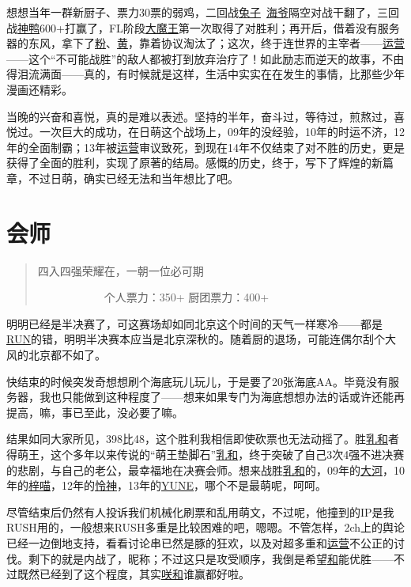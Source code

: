 想想当年一群新厨子、票力30票的弱鸡，二回战\uline{兔子}~\uline{海爷}隔空对战干翻了，三回战\uline{神鸭}600+打赢了，FL阶段\uline{大魔王}第一次取得了对胜利；再开后，借着没有服务器的东风，拿下了\uline{粉}、\uline{黄}，靠着协议淘汰了；这次，终于连世界的主宰者——\uline{运营}——这个“不可能战胜”的敌人都被打到放弃治疗了！如此励志而逆天的故事，不由得泪流满面——真的，有时候就是这样，生活中实实在在发生的事情，比那些少年漫画还精彩。

当晚的兴奋和喜悦，真的是难以表述。坚持的半年，奋斗过，等待过，煎熬过，喜悦过。一次巨大的成功，在日萌这个战场上，09年的没经验，10年的时运不济，12年的全面制霸；13年被\uline{运营}审议致死，到现在14年不仅结束了对不胜的历史，更是获得了全面的胜利，实现了原著的结局。感慨的历史，终于，写下了辉煌的新篇章，不过日萌，确实已经无法和当年想比了吧。

\chapter{会师}
\begin{quote}
四入四强荣耀在，一朝一位必可期

　　　　　　个人票力：350+ 厨团票力：400+
\end{quote}

明明已经是半决赛了，可这赛场却如同北京这个时间的天气一样寒冷——都是\uline{RUN}的错，明明半决赛本应当是北京深秋的。随着厨的退场，可能连偶尔刮个大风的北京都不如了。

快结束的时候突发奇想想刷个海底玩儿玩儿，于是要了20张海底AA。毕竟没有服务器，我也只能做到这种程度了——想来如果专门为海底想想办法的话或许还能再提高，嘛，事已至此，没必要了嘛。

结果如同大家所见，398比48，这个胜利我相信即使砍票也无法动摇了。胜\uline{乳和}者得萌王，这个多年以来传说的“萌王垫脚石”\uline{乳和}，终于突破了自己3次4强不进决赛的悲剧，与自己的老公，最幸福地在决赛会师。想来战胜\uline{乳和}的，09年的\uline{大河}，10年的\uline{梓喵}，12年的\uline{怜神}，13年的\uline{YUNE}，哪个不是最萌呢，呵呵。

尽管结束后仍然有人投诉我们机械化刷票和乱用萌文，不过呢，他撞到的IP是我RUSH用的，一般想来RUSH多重是比较困难的吧，嗯嗯。不管怎样，2ch上的舆论已经一边倒地支持，看看讨论串已然是豚的狂欢，以及对超多重和\uline{运营}不公正的讨伐。剩下的就是内战了，昵称；不过这只是攻受顺序，我倒是希望\uline{和}能优胜——不过既然已经到了这个程度，其实\uline{咲}\uline{和}谁赢都好啦。

